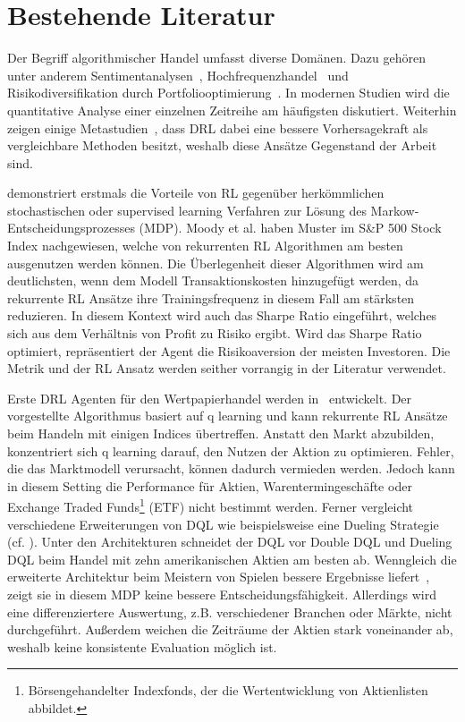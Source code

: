 \chapter{Bestehende Literatur}
\label{ch:bestehende_literatur}

Der Begriff \glqq algorithmischer Handel\grqq{} umfasst diverse Domänen. Dazu gehören unter anderem Sentimentanalysen~\parencite{sentiment}, Hochfrequenzhandel~\parencite{highfrequ} und Risikodiversifikation durch Portfoliooptimierung~\parencite{portfolio}.
In modernen Studien wird die quantitative Analyse einer einzelnen Zeitreihe am häufigsten diskutiert. Weiterhin zeigen einige Metastudien~\parencite{meta,meta2}, dass \acs{DRL} dabei eine bessere Vorhersagekraft als vergleichbare Methoden besitzt, weshalb diese Ansätze Gegenstand der Arbeit sind.

\parencite{moodywu,moodysaffell} demonstriert erstmals die Vorteile von \acs{RL} gegenüber herkömmlichen stochastischen oder supervised learning Verfahren zur Lösung des Markow-Entscheidungsprozesses (\acs{MDP}).
Moody et al. \parencite{moodywu,moodysaffell} haben Muster im S\&P 500 Stock Index nachgewiesen, welche von rekurrenten \acs{RL} Algorithmen am besten ausgenutzen werden können. Die Überlegenheit dieser Algorithmen wird am deutlichsten, wenn dem Modell Transaktionskosten hinzugefügt werden, da rekurrente \acs{RL} Ansätze ihre Trainingsfrequenz in diesem Fall am stärksten reduzieren. 
In diesem Kontext wird auch das Sharpe Ratio eingeführt, welches sich aus dem Verhältnis von Profit zu Risiko ergibt. Wird das Sharpe Ratio optimiert, repräsentiert der Agent die Risikoaversion der meisten Investoren. Die Metrik und der \acs{RL} Ansatz werden seither vorrangig in der Literatur verwendet. 

Erste \acs{DRL} Agenten für den Wertpapierhandel werden in~\parencite{deepQtrader} entwickelt. Der vorgestellte Algorithmus basiert auf q learning und kann rekurrente \acs{RL} Ansätze beim Handeln mit einigen Indices übertreffen. Anstatt den Markt abzubilden, konzentriert sich q learning darauf, den Nutzen der Aktion zu optimieren. Fehler, die das Marktmodell verursacht, können dadurch vermieden werden. Jedoch kann in diesem Setting die Performance für Aktien, Warentermingeschäfte oder Exchange Traded Funds\footnote{Börsengehandelter Indexfonds, der die Wertentwicklung von Aktienlisten abbildet.} (\acs{ETF}) nicht bestimmt werden.
Ferner vergleicht~\parencite{duel} verschiedene Erweiterungen von \acs{DQL} wie beispielsweise eine Dueling Strategie (cf. \parencites{duelwang}). Unter den Architekturen schneidet der \acs{DQL} vor Double \acs{DQL} und Dueling \acs{DQL} beim Handel mit zehn amerikanischen Aktien am besten ab. Wenngleich die erweiterte Architektur beim Meistern von Spielen bessere Ergebnisse liefert~\parencite{doublebetter}, zeigt sie in diesem \acs{MDP} keine bessere Entscheidungsfähigkeit.
Allerdings wird eine differenziertere Auswertung, z.B. verschiedener Branchen oder Märkte, nicht durchgeführt. Außerdem weichen die Zeiträume der Aktien stark voneinander ab, weshalb keine konsistente Evaluation möglich ist.

